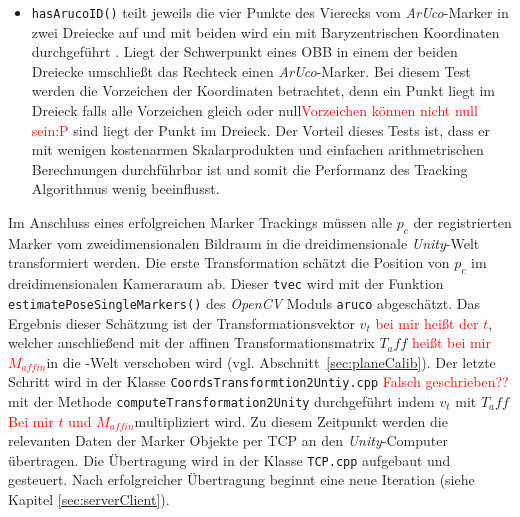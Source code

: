 \begin{itemize}
\item \texttt{hasArucoID()} teilt jeweils die vier Punkte des Vierecks vom \textit{ArUco}-Marker in zwei Dreiecke auf und mit beiden wird ein  mit Baryzentrischen Koordinaten durchgeführt \cite{article:BaryzentriFarin}. Liegt der Schwerpunkt eines OBB in einem der beiden Dreiecke umschließt das Rechteck einen \textit{ArUco}-Marker. Bei diesem Test werden die Vorzeichen der Koordinaten betrachtet, denn ein Punkt liegt im Dreieck falls alle Vorzeichen gleich oder null\textcolor{red}{Vorzeichen können nicht null sein:P} sind liegt der Punkt im Dreieck. Der Vorteil dieses Tests ist, dass er mit wenigen kostenarmen Skalarprodukten und einfachen arithmetrischen Berechnungen durchführbar ist und somit die Performanz des Tracking Algorithmus wenig beeinflusst. 
\end{itemize}
Im Anschluss eines erfolgreichen Marker Trackings müssen alle $p_c$ der registrierten Marker vom zweidimensionalen Bildraum in die dreidimensionale \textit{Unity}-Welt transformiert werden. Die erste Transformation schätzt die Position von $p_c$ im dreidimensionalen Kameraraum ab. Dieser \texttt{tvec} wird mit der Funktion \texttt{estimate\-Pose\-Single\-Markers()} des \textit{OpenCV} Moduls \texttt{aruco} abgeschätzt.
Das Ergebnis dieser Schätzung ist der Transformationsvektor $v_t$ \textcolor{red}{bei mir heißt der $t$}, welcher anschließend mit der affinen Transformationsmatrix $T_aff$ \textcolor{red}{heißt bei mir $M_{affin}$}in die -Welt verschoben wird (vgl. Abschnitt~\ref{sec:planeCalib}). Der letzte Schritt wird in der Klasse \texttt{Coords\-Trans\-formtion\-2Untiy.cpp} \textcolor{red}{Falsch geschrieben??} mit der Methode \texttt{computeTransformation2Unity} durchgeführt indem $v_t$ mit $T_aff$ \textcolor{red}{Bei mir $t$ und $M_{affin}$}multipliziert wird. Zu diesem Zeitpunkt werden die relevanten Daten der Marker Objekte per TCP an den \textit{Unity}-Computer übertragen. Die Übertragung wird in der Klasse \texttt{TCP.cpp} aufgebaut und gesteuert. Nach erfolgreicher Übertragung beginnt eine neue Iteration (siehe Kapitel \ref{sec:serverClient}).

\newpage